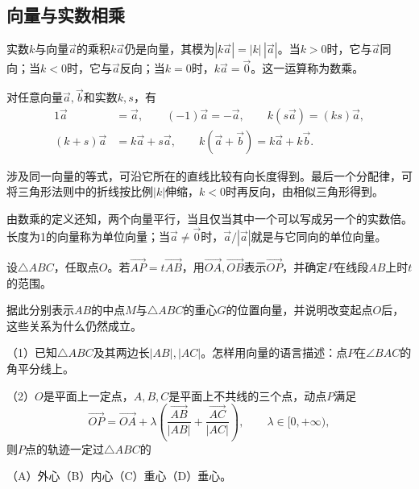 \newpage
\subsection{向量与实数相乘}

\begin{definition}\label{def:geometric-scalar-multiplication}
实数\(k\)与向量\(\vec a\)的乘积\(k\vec a\)仍是向量，其模为\(|k\vec a|=|k|\,|\vec a|\)。当\(k>0\)时，它与\(\vec a\)同向；当\(k<0\)时，它与\(\vec a\)反向；当\(k=0\)时，\(k\vec a=\vec0\)。这一运算称为{\heiti 数乘}。
\end{definition}

\begin{proposition}\label{prop:geometric-scalar-laws}
对任意向量\(\vec a,\vec b\)和实数\(k,s\)，有
\[
\begin{aligned}
 1\vec a&=\vec a,\qquad (-1)\vec a=-\vec a,\qquad
 k(s\vec a)=(ks)\vec a,\\
 (k+s)\vec a&=k\vec a+s\vec a,\qquad
 k(\vec a+\vec b)=k\vec a+k\vec b.
\end{aligned}
\]
\end{proposition}

涉及同一向量的等式，可沿它所在的直线比较有向长度得到。最后一个分配律，可将三角形法则中的折线按比例\(|k|\)伸缩，\(k<0\)时再反向，由相似三角形得到。

由数乘的定义还知，两个向量平行，当且仅当其中一个可以写成另一个的实数倍。长度为1的向量称为{\heiti 单位向量}；当\(\vec a\ne\vec0\)时，\(\vec a/|\vec a|\)就是与它同向的单位向量。

\begin{example}\label{ex:vector-division-centroid}
设\(\triangle ABC\)，任取点\(O\)。若\(\vec{AP}=t\vec{AB}\)，用\(\vec{OA},\vec{OB}\)表示\(\vec{OP}\)，并确定\(P\)在线段\(AB\)上时\(t\)的范围。

据此分别表示\(AB\)的中点\(M\)与\(\triangle ABC\)的重心\(G\)的位置向量，并说明改变起点\(O\)后，这些关系为什么仍然成立。
\end{example}

\begin{example}
（1）已知\(\triangle ABC\)及其两边长\(|AB|,|AC|\)。怎样用向量的语言描述：点\(P\)在\(\angle BAC\)的角平分线上。

（2）\(O\)是平面上一定点，\(A,B,C\)是平面上不共线的三个点，动点\(P\)满足
\[
 \vec{OP}=\vec{OA}+\lambda\left(\frac{\vec{AB}}{|AB|}+\frac{\vec{AC}}{|AC|}\right),
 \qquad\lambda\in[0,+\infty),
\]
则\(P\)点的轨迹一定过\(\triangle ABC\)的

（A）外心\quad （B）内心\quad （C）重心\quad （D）垂心。
\end{example}


